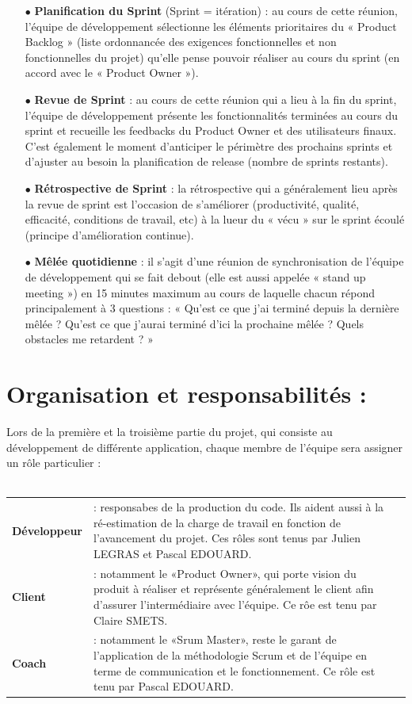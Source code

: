 \documentclass[a4paper,11pt,french]{article}
\begin{document}
\newpage

\begin{itemize}
\item [$\bullet$] \textbf{Planification du Sprint} (Sprint = itération) : au cours de cette réunion, l’équipe de développement sélectionne les éléments prioritaires du « Product Backlog » (liste ordonnancée des exigences fonctionnelles et non fonctionnelles du projet) qu’elle pense pouvoir réaliser au cours du sprint (en accord avec le « Product Owner »).
\item [$\bullet$] \textbf{Revue de Sprint} : au cours de cette réunion qui a lieu à la fin du sprint, l’équipe de développement présente les fonctionnalités terminées au cours du sprint et recueille les feedbacks du Product Owner et des utilisateurs finaux. C’est également le moment d’anticiper le périmètre des prochains sprints et d’ajuster au besoin la planification de release (nombre de sprints restants).
\item [$\bullet$] \textbf{Rétrospective de Sprint} : la rétrospective qui a généralement lieu après la revue de sprint est l’occasion de s’améliorer (productivité, qualité, efficacité, conditions de travail, etc) à la lueur du « vécu » sur le sprint écoulé (principe d’amélioration continue).
\item [$\bullet$] \textbf{Mêlée quotidienne} : il s’agit d’une réunion de synchronisation de l’équipe de développement qui se fait debout (elle est aussi appelée « stand up meeting ») en 15 minutes maximum au cours de laquelle chacun répond principalement à 3 questions : « Qu’est ce que j’ai terminé depuis la dernière mêlée ? Qu’est ce que j’aurai terminé d’ici la prochaine mêlée ? Quels obstacles me retardent ? »
\end{itemize}

\section{Organisation et responsabilités :}

Lors de la première et la troisième partie du projet, qui consiste au développement de différente application, chaque membre de l'équipe sera assigner un rôle particulier :\\ \\
\begin{tabular}{lll}
\textbf{Développeur} 	& : responsabes de la production du code. Ils aident aussi à la ré-estimation de la charge de travail en fonction de l'avancement du projet. Ces rôles sont tenus par Julien LEGRAS et Pascal EDOUARD. \\
\textbf{Client}			& : notamment le «Product Owner», qui porte vision du produit à réaliser et représente généralement le client afin d'assurer l'intermédiaire avec l'équipe. Ce rôe est tenu par Claire SMETS.\\
\textbf{Coach}			& : notamment le «Srum Master», reste le garant de l'application de la méthodologie Scrum et de l'équipe en terme de communication et le fonctionnement. Ce rôle est tenu par Pascal EDOUARD.\\
\end{tabular}
\end{document}

